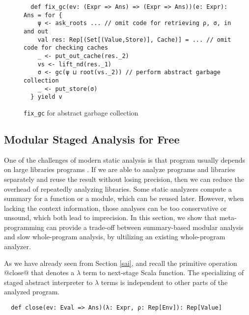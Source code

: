 \begin{figure}[h!]
\begin{lstlisting}
  def fix_gc(ev: (Expr => Ans) => (Expr => Ans))(e: Expr): Ans = for {
    ψ <- ask_roots ... // omit code for retrieving ρ, σ, in and out
    val res: Rep[(Set[(Value,Store)], Cache)] = ... // omit code for checking caches
    _ <- put_out_cache(res._2)
    vs <- lift_nd(res._1)
    σ <- gc(ψ ⊔ root(vs._2)) // perform abstract garbage collection
    _ <- put_store(σ)
  } yield v
\end{lstlisting}
\vspace{-2em}
\caption{\texttt{fix\_gc} for abstract garbage collection} \label{fixgc}
\end{figure}



\subsection{Modular Staged Analysis for Free} \label{modular}


One of the challenges of modern static analysis is that program
usually depends on large libraries programs
\cite{toman_et_al:LIPIcs:2017:7121}. If we are able to analyze
programs and libraries separately and reuse the result without losing
precision, then we can reduce the overhead of repeatedly analyzing
libraries. Some static analyzers compute a summary for a function or a
module, which can be reused later. However, when lacking the context
information, those analyses can be too conservative or unsound, which
both lead to imprecision. In this section, we show that
meta-programming can provide a trade-off between summary-based modular
analysis and slow whole-program analysis, by ultilizing an existing
whole-program analyzer.

As we have already seen from Section \ref{sai}, and recall the
primitive operation @close@ that denotes a $\lambda$ term to next-stage
Scala function.  The specializing of staged abstract interpreter to
$\lambda$ terms is independent to other parts of the analyzed program.
\begin{lstlisting}
  def close(ev: Eval => Ans)(λ: Expr, ρ: Rep[Env]): Rep[Value]
\end{lstlisting}

